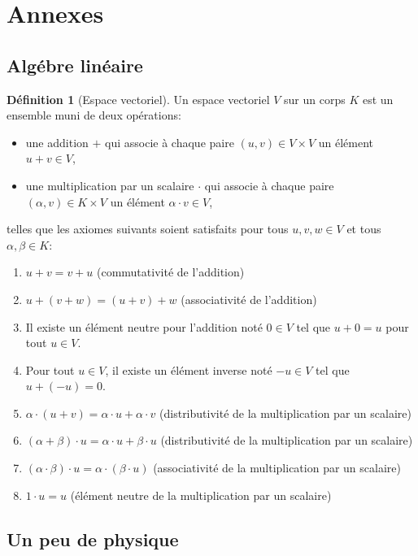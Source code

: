 \documentclass[11pt,a4paper]{article}
\numberwithin{equation}{section}
\theoremstyle{plain}
\theoremstyle{definition}
\newtheorem{definition}[theorem]{Définition}
\theoremstyle{remark}
\begin{document}
\section{Annexes}

\subsection{Algébre linéaire}

\begin{definition}[Espace vectoriel]
    Un espace vectoriel \(V\) sur un corps \(K\) est un ensemble muni de deux opérations:
    \begin{itemize}
        \item une addition \(+\) qui associe à chaque paire \((u, v) \in V \times V\) un élément \(u + v \in V\),
        \item une multiplication par un scalaire \(\cdot\) qui associe à chaque paire \((\alpha, v) \in K \times V\) un élément \(\alpha \cdot v \in V\),
    \end{itemize}
    telles que les axiomes suivants soient satisfaits pour tous \(u, v, w \in V\) et tous \(\alpha, \beta \in K\):
    \begin{enumerate}
        \item \(u + v = v + u\) (commutativité de l'addition)
        \item \(u + (v + w) = (u + v) + w\) (associativité de l'addition)
        \item Il existe un élément neutre pour l'addition noté \(0 \in V\) tel que \(u + 0 = u\) pour tout \(u \in V\).
        \item Pour tout \(u \in V\), il existe un élément inverse noté \(-u \in V\) tel que \(u + (-u) = 0\).
        \item \(\alpha \cdot (u + v) = \alpha \cdot u + \alpha \cdot v\) (distributivité de la multiplication par un scalaire)
        \item \((\alpha + \beta) \cdot u = \alpha \cdot u + \beta \cdot u\) (distributivité de la multiplication par un scalaire)
        \item \((\alpha \cdot \beta) \cdot u = \alpha \cdot (\beta \cdot u)\) (associativité de la multiplication par un scalaire)
        \item \(1 \cdot u = u\) (élément neutre de la multiplication par un scalaire)
    \end{enumerate}
\end{definition}

\subsection{Un peu de physique}
\end{document}
